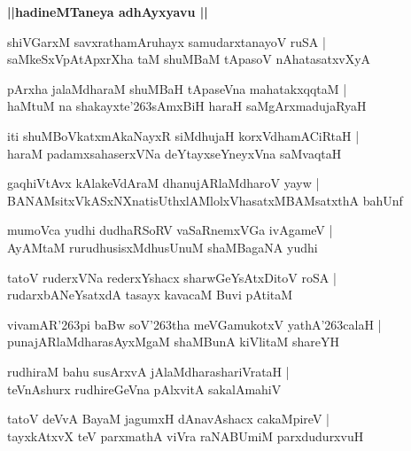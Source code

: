 \documentclass[twoside,12pt,openright]{book}
\def\S{\char'263}
\newcounter{shloka}[chapter]
\def\uvaca#1{\centerline{{\large\textbf{#1}}}}
\begin{document}
\uvaca{||hadineMTaneya adhAyxyavu ||}

\begin{shloka}%
shiVGarxM savxrathamAruhayx samudarxtanayoV ruSA |\\
saMkeSxVpAtApxrXha taM shuMBaM tApasoV nAhatasatxvXyA 
\end{shloka}

\begin{shloka}%
pArxha jalaMdharaM shuMBaH tApaseVna mahatakxqqtaM |\\
haMtuM na shakayxte\S sAmxBiH haraH saMgArxmadujaRyaH 
\end{shloka}

\begin{shloka}%
iti shuMBoVkatxmAkaNayxR siMdhujaH korxVdhamACiRtaH |\\
haraM padamxsahaserxVNa deYtayxseYneyxVna saMvaqtaH 
\end{shloka}

\begin{shloka}%
gaqhiVtAvx kAlakeVdAraM dhanujARlaMdharoV yayw |\\
BANAMsitxVkASxNXnatisUthxlAMlolxVhasatxMBAMsatxthA bahUnf 
\end{shloka}

\begin{shloka}%
mumoVca yudhi dudhaRSoRV vaSaRnemxVGa ivAgameV |\\
AyAMtaM rurudhusisxMdhusUnuM shaMBagaNA yudhi
\end{shloka}

\begin{shloka}%
tatoV ruderxVNa rederxYshacx sharwGeYsAtxDitoV roSA |\\
rudarxbANeYsatxdA tasayx kavacaM Buvi pAtitaM 
\end{shloka}

\begin{shloka}%
vivamAR\S pi baBw soV\S tha meVGamukotxV yathA\S calaH |\\
punajARlaMdharasAyxMgaM shaMBunA kiVlitaM shareYH
\end{shloka}

\begin{shloka}%
rudhiraM bahu susArxvA jAlaMdharashariVrataH |\\
teVnAshurx rudhireGeVna pAlxvitA sakalAmahiV 
\end{shloka}

\begin{shloka}%
tatoV deVvA BayaM jagumxH dAnavAshacx cakaMpireV |\\
tayxkAtxvX teV parxmathA viVra raNABUmiM parxdudurxvuH
\end{shloka}
\end{document}
